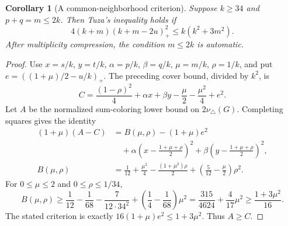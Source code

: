 \documentclass[11pt]{article}
\newtheorem{corollary}[theorem]{Corollary}
\newcommand{\tp}{\nu_{\triangle}}
\begin{document}
\begin{corollary}[A common-neighborhood criterion]
\label{cor:common-cut}
Suppose $k\geq34$ and $p+q=m\leq2k$. Then Tuza's inequality holds if
\[
 \boxed{4(k+m)(k+m-2u)_+^2\leq k(k^2+3m^2).}
\]
After multiplicity compression, the condition $m\leq2k$ is automatic.
\end{corollary}
\begin{proof}
Use $x=s/k$, $y=t/k$, $\alpha=p/k$, $\beta=q/k$, $\mu=m/k$,
$\rho=1/k$, and put $e=((1+\mu)/2-u/k)_+$.
The preceding cover bound, divided by $k^2$, is
\[
 C=\frac{(1-\rho)^2}{4}+\alpha x+\beta y
                      -\frac\mu2-\frac{\mu^2}{4}+e^2.
\]
Let $A$ be the normalized sum-coloring lower bound on $2\tp(G)$.
Completing squares gives the identity
\begin{align*}
 (1+\mu)(A-C)
 &=B(\mu,\rho)-(1+\mu)e^2\\
 &\quad+\alpha\left(x-\frac{1+\mu+\rho}{2}\right)^2
       +\beta\left(y-\frac{1+\mu+\rho}{2}\right)^2,\\
 B(\mu,\rho)
 &=\frac1{12}+\frac{\mu^2}{4}
       -\frac{(1+\mu^2)\rho}{2}
       +\left(\frac5{12}-\frac\mu2\right)\rho^2.
\end{align*}
For $0\leq\mu\leq2$ and $0\leq\rho\leq1/34$,
\[
 B(\mu,\rho)\geq
 \frac1{12}-\frac1{68}-\frac7{12\cdot34^2}
             +\left(\frac14-\frac1{68}\right)\mu^2
 =\frac{315}{4624}+\frac4{17}\mu^2
 \geq\frac{1+3\mu^2}{16}.
\]
The stated criterion is exactly
$16(1+\mu)e^2\leq1+3\mu^2$. Thus $A\geq C$.
\end{proof}
\end{document}

